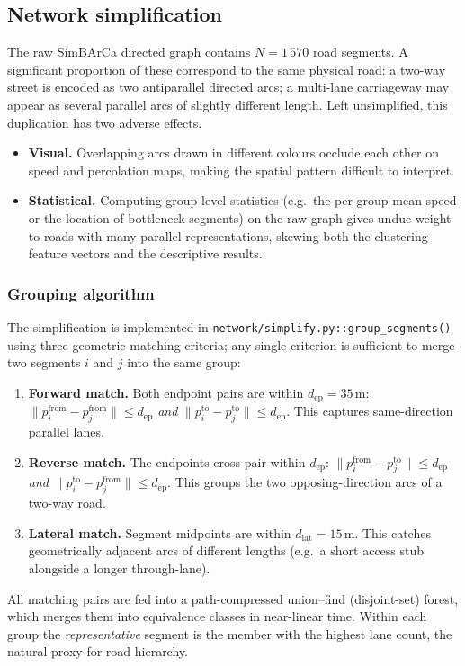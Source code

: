 \documentclass[11pt,a4paper]{article}
\begin{document}
\subsection{Network simplification}
\label{sec:data:simplify}

The raw SimBArCa directed graph contains $N = 1\,570$ road segments.  A
significant proportion of these correspond to the same physical road: a
two-way street is encoded as two antiparallel directed arcs; a multi-lane
carriageway may appear as several parallel arcs of slightly different length.
Left unsimplified, this duplication has two adverse effects.
\begin{itemize}
  \item \textbf{Visual.}  Overlapping arcs drawn in different colours
    occlude each other on speed and percolation maps, making the spatial
    pattern difficult to interpret.
  \item \textbf{Statistical.}  Computing group-level statistics (e.g.\ the
    per-group mean speed or the location of bottleneck segments) on the raw
    graph gives undue weight to roads with many parallel representations,
    skewing both the clustering feature vectors and the descriptive results.
\end{itemize}

\subsubsection*{Grouping algorithm}

The simplification is implemented in
\texttt{network/simplify.py::\allowbreak{}group\_segments()} using three
geometric matching criteria; any single criterion is sufficient to merge two
segments $i$ and $j$ into the same group:
\begin{enumerate}
  \item \textbf{Forward match.}  Both endpoint pairs are within
    $d_{\mathrm{ep}} = 35$\,m: $\|p^{\mathrm{from}}_i - p^{\mathrm{from}}_j\|
    \leq d_{\mathrm{ep}}$ \emph{and}
    $\|p^{\mathrm{to}}_i - p^{\mathrm{to}}_j\| \leq d_{\mathrm{ep}}$.
    This captures same-direction parallel lanes.
  \item \textbf{Reverse match.}  The endpoints cross-pair within
    $d_{\mathrm{ep}}$: $\|p^{\mathrm{from}}_i - p^{\mathrm{to}}_j\| \leq
    d_{\mathrm{ep}}$ \emph{and}
    $\|p^{\mathrm{to}}_i - p^{\mathrm{from}}_j\| \leq d_{\mathrm{ep}}$.
    This groups the two opposing-direction arcs of a two-way road.
  \item \textbf{Lateral match.}  Segment midpoints are within
    $d_{\mathrm{lat}} = 15$\,m.  This catches geometrically adjacent arcs of
    different lengths (e.g.\ a short access stub alongside a longer
    through-lane).
\end{enumerate}
All matching pairs are fed into a path-compressed union--find (disjoint-set)
forest, which merges them into equivalence classes in near-linear time.
Within each group the \emph{representative} segment is the member with the
highest lane count, the natural proxy for road hierarchy.
\end{document}
